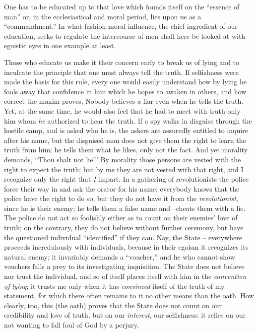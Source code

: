 One has to be educated up to that love which founds itself on the ``essence 
of man'' or, in the ecclesiastical and moral period, lies upon us as a 
``commandment.'' In what fashion moral influence, the chief ingredient of 
our education, seeks to regulate the intercourse of men shall here be looked 
at with egoistic eyes in one example at least.

Those who educate us make it their concern early to break us of lying and to 
inculcate the principle that one must always tell the truth. If selfishness 
were made the basis for this rule, every one would easily understand how by 
lying he fools away that confidence in him which he hopes to awaken in others, 
and how correct the maxim proves, Nobody believes a liar even when he tells 
the truth. Yet, at the same time, he would also feel that he had to meet with 
truth only him whom \textit{he} authorized to hear the truth. If a spy walks 
in disguise through the hostile camp, and is asked who he is, the askers are 
assuredly entitled to inquire after his name, but the disguised man does not 
give them the right to learn the truth from him; he tells them what he likes, 
only not the fact. And yet morality demands, ``Thou shalt not lie!'' By 
morality those persons are vested with the right to expect the truth; but by 
me they are not vested with that right, and I recognize only the right that 
\textit{I} impart. In a gathering of revolutionists the police force their way 
in and ask the orator for his name; everybody knows that the police have the 
right to do so, but they do not have it from the \textit{revolutionist}, since 
he is their enemy; he tells them a false name and --cheats them with a lie. 
The police do not act so foolishly either as to count on their enemies' love 
of truth; on the contrary, they do not believe without further ceremony, but 
have the questioned individual ``identified'' if they can. Nay, the State -- 
everywhere proceeds incredulously with individuals, because in their egoism it 
recognizes its natural enemy; it invariably demands a ``voucher,'' and he 
who cannot show vouchers falls a prey to its investigating inquisition. The 
State does not believe nor trust the individual, and so of itself places 
itself with him in the \textit{convention of lying}; it trusts me only when it 
has \textit{convinced} itself of the truth of my statement, for which there 
often remains to it no other means than the oath. How clearly, too, this (the 
oath) proves that the State does not count on our credibility and love of 
truth, but on our \textit{interest}, our selfishness: it relies on our not 
wanting to fall foul of God by a perjury.

